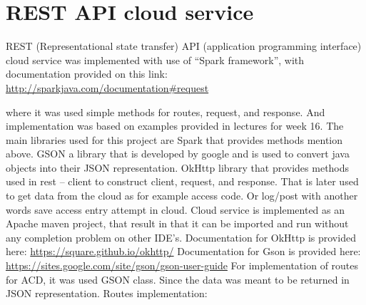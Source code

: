 \section{REST API cloud service}
\label{sec:cloud_service}

REST (Representational state transfer)  API (application programming interface) cloud service was implemented with use of “Spark framework”, with documentation provided on this link: 
\newline
\url{http://sparkjava.com/documentation#request}

where it was used simple methods for routes, request, and response. And implementation was based on examples provided in lectures for week 16. The main libraries used for this project are Spark that provides methods mention above. GSON a library that is developed by google and is used to convert java objects into their JSON representation. OkHttp library that provides methods used in rest – client to construct client, request, and response. That is later used to get data from the cloud as for example access code. Or log/post with another words save access entry attempt in cloud. Cloud service is implemented as an Apache maven project, that result in that it can be imported and run without any completion problem on other IDE’s. 
\newline\newline
Documentation for OkHttp is provided here: \url{https://square.github.io/okhttp/}
\newline\newline
Documentation for Gson is provided here: \url{https://sites.google.com/site/gson/gson-user-guide}
\newline\newline
For implementation of routes for ACD, it was used GSON class. Since the data was meant to be returned in JSON representation. 
\newline\newline
Routes implementation:


